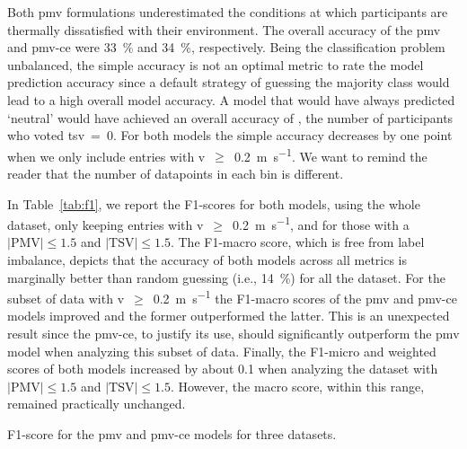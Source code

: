 Both \ac{pmv} formulations underestimated the conditions at which participants are thermally dissatisfied with their environment.
The overall accuracy of the \ac{pmv} and \ac{pmv-ce} were \qty{33}{\percent} and \qty{34}{\percent}, respectively.
Being the classification problem unbalanced, the simple accuracy is not an optimal metric to rate the model prediction accuracy since a default strategy of guessing the majority class would lead to a high overall model accuracy.
A model that would have always predicted `neutral' would have achieved an overall accuracy of , the number of participants who voted \ac{tsv}~=~0.
For both models the simple accuracy decreases by one point when we only include entries with \ac{v}~$\geq$~\qty{0.2}{\m\per\s}.
We want to remind the reader that the number of datapoints in each bin is different.

In Table~\ref{tab:f1}, we report the F1-scores for both models, using the whole dataset, only keeping entries with \ac{v}~$\geq$~\qty{0.2}{\m\per\s}, and for those with a $\lvert \textrm{PMV}\lvert \leq 1.5$ and $\lvert \textrm{TSV}\lvert \leq 1.5$.
The F1-macro score, which is free from label imbalance, depicts that the accuracy of both models across all metrics is marginally better than random guessing (i.e., \qty{14}{\percent}) for all the dataset.
For the subset of data with \ac{v}~$\geq$~\qty{0.2}{\m\per\s} the F1-macro scores of the \ac{pmv} and \ac{pmv-ce} models improved and the former outperformed the latter.
This is an unexpected result since the \ac{pmv-ce}, to justify its use, should significantly outperform the \ac{pmv} model when analyzing this subset of data.
Finally, the F1-micro and weighted scores of both models increased by about 0.1 when analyzing the dataset with $\lvert \textrm{PMV}\lvert \leq 1.5$ and $\lvert \textrm{TSV}\lvert \leq 1.5$.
However, the macro score, within this range, remained practically unchanged.
\begin{table}[htb!]
    \centering
    
    \caption{F1-score for the \ac{pmv} and \ac{pmv-ce} models for three datasets.}
    \label{tab:f1}
\end{table}

